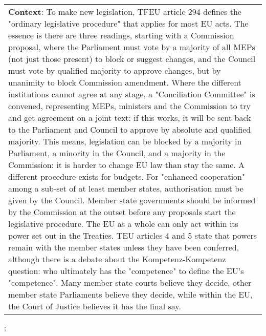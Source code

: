 \begin{figure*}[ht]
{\begin{tabular}{p{}}
            \textbf{Context}: To make new legislation, TFEU article 294 defines the "ordinary legislative procedure" that applies for most EU acts. The essence is there are three readings, starting with a Commission proposal, where the Parliament must vote by a majority of all MEPs (not just those present) to block or suggest changes, and the Council must vote by qualified majority to approve changes, but by unanimity to block Commission amendment. Where the different institutions cannot agree at any stage, a "Conciliation Committee" is convened, representing MEPs, ministers and the Commission to try and get agreement on a joint text: if this works, it will be sent back to the Parliament and Council to approve by absolute and qualified majority. This means, legislation can be blocked by a majority in Parliament, a minority in the Council, and a majority in the Commission: it is harder to change EU law than stay the same. A different procedure exists for budgets. For "enhanced cooperation" among a sub-set of at least member states, authorisation must be given by the Council. Member state governments should be informed by the Commission at the outset before any proposals start the legislative procedure. The EU as a whole can only act within its power set out in the Treaties. TEU articles 4 and 5 state that powers remain with the member states unless they have been conferred, although there is a debate about the Kompetenz-Kompetenz question: who ultimately has the "competence" to define the EU's "competence". Many member state courts believe they decide, other member state Parliaments believe they decide, while within the EU, the Court of Justice believes it has the final say. \\
        \end{tabular}
    };
    \label{fig:ex-572695285951b619008f774c}
\end{figure*}

